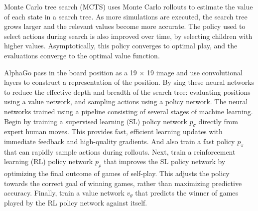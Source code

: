 \documentclass[12pt,a4paper]{article}
\begin{document}
{\hspace{0cm} Monte Carlo tree search (MCTS)\cite{CoulomMCTS}\cite{KocsisMCTS} uses Monte Carlo rollouts to estimate the value of each state in a search tree. As more simulations are executed, the search tree grows larger and the relevant values become more accurate. The policy used to select actions during search is also improved over time, by selecting children with higher values. Asymptotically, this policy converges to optimal play, and the evaluations converge to the optimal value function\cite{KocsisMCTS}. \par
AlphaGo pass in the board position as a 19 × 19 image and use convolutional layers to construct a representation of the position. By sing these neural networks to reduce the effective depth and breadth of the search tree: evaluating positions using a value network, and sampling actions using a policy network. The neural networks trained using a pipeline consisting of several stages of machine learning. Begin by training a supervised learning (SL) policy network \(p_\sigma\) directly from expert human moves. This provides fast, efficient learning updates with immediate feedback and high-quality gradients. And also train a fast policy \(p_\pi\) that can rapidly sample actions during rollouts. Next, train a reinforcement learning (RL) policy network \(p_\rho\) that improves the SL policy network by optimizing the final outcome of games of self-play. This adjusts the policy towards the correct goal of winning games, rather than maximizing predictive accuracy. Finally, train a value network \(v_\theta\) that predicts the winner of games played by the RL policy network against itself.\par
}
\end{document}
